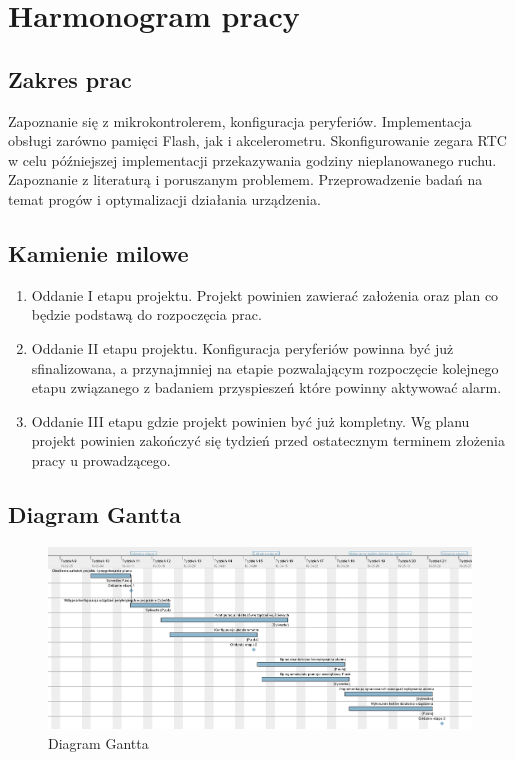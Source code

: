 \documentclass[10pt, a4paper]{article}
\begin{document}
\section{Harmonogram pracy}

\subsection{Zakres prac}
Zapoznanie się z mikrokontrolerem, konfiguracja peryferiów. Implementacja obsługi zarówno pamięci Flash, jak i akcelerometru. Skonfigurowanie zegara RTC w celu późniejszej implementacji przekazywania godziny nieplanowanego ruchu. Zapoznanie z literaturą i poruszanym problemem. Przeprowadzenie badań na temat progów i optymalizacji działania urządzenia. 
\subsection{Kamienie milowe}
\begin{enumerate}
\item Oddanie I etapu projektu. Projekt powinien zawierać założenia oraz plan co będzie podstawą do rozpoczęcia prac.
\item Oddanie II etapu projektu. Konfiguracja peryferiów powinna być już sfinalizowana, a przynajmniej na etapie pozwalającym rozpoczęcie kolejnego etapu związanego z badaniem przyspieszeń które powinny aktywować alarm.
\item Oddanie III etapu gdzie projekt powinien być już kompletny.
Wg planu projekt powinien zakończyć się tydzień przed ostatecznym terminem złożenia pracy u prowadzącego.
\end{enumerate}
\subsection{Diagram Gantta}


\begin{figure}[H]
	\centering
	\includegraphics[width=1\textwidth]{figures/dg.png}
	\caption{Diagram Gantta}
	\label{fig:DiagramGantta}
\end{figure}
\end{document}
